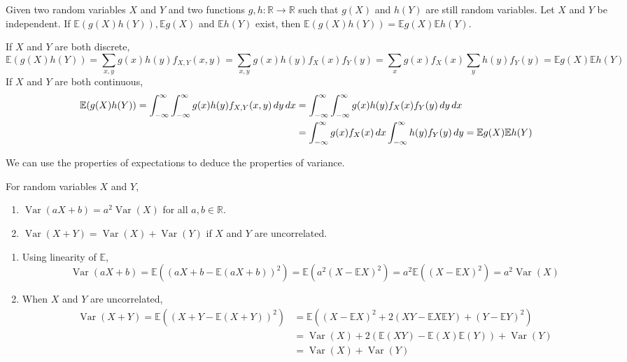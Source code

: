 \documentclass{huhtakm-template-book}
\newcommand{\expect}{\mathbb{E}}
\DeclareMathOperator{\Var}{Var}
\begin{document}
\begin{thm}
	Given two random variables $X$ and $Y$ and two functions $g,h:\mathbb{R}\to\mathbb{R}$ such that $g(X)$ and $h(Y)$ are still random variables. Let $X$ and $Y$ be independent. If $\expect(g(X)h(Y)),\expect{g(X)}$ and $\expect{h(Y)}$ exist, then $\expect(g(X)h(Y))=\expect g(X)\expect h(Y)$.
\end{thm}
\begin{proofing}
	If $X$ and $Y$ are both discrete,
	\begin{equation*}
		\expect(g(X)h(Y))=\sum_{x,y}g(x)h(y)f_{X,Y}(x,y)=\sum_{x,y}g(x)h(y)f_{X}(x)f_{Y}(y)=\sum_{x}g(x)f_{X}(x)\sum_{y}h(y)f_{Y}(y)=\expect g(X)\expect h(Y)
	\end{equation*}
	If $X$ and $Y$ are both continuous,
	\begin{align*}
		\expect(g(X)h(Y))=\intinfty\intinfty g(x)h(y)f_{X,Y}(x,y)\,dy\,dx&=\intinfty\intinfty g(x)h(y)f_{X}(x)f_{Y}(y)\,dy\,dx\\
		&=\intinfty g(x)f_{X}(x)\,dx\intinfty h(y)f_{Y}(y)\,dy=\expect{g(X)}\expect{h(Y)}
	\end{align*}
\end{proofing}
We can use the properties of expectations to deduce the properties of variance.
\begin{thm}
	For random variables $X$ and $Y$,
	\begin{enumerate}
		\item $\Var(aX+b)=a^{2}\Var(X)$ for all $a,b\in\mathbb{R}$.
		\item $\Var(X+Y)=\Var(X)+\Var(Y)$ if $X$ and $Y$ are uncorrelated.
	\end{enumerate}
\end{thm}
\begin{proofing}
	\begin{enumerate}
		\item Using linearity of $\expect$,
		\begin{equation*}
			\Var(aX+b)=\expect((aX+b-\expect(aX+b))^{2})=\expect(a^{2}(X-\expect X)^{2})=a^{2}\expect((X-\expect X)^{2})=a^{2}\Var(X)
		\end{equation*}
		\item When $X$ and $Y$ are uncorrelated,
		\begin{align*}
			\Var(X+Y)=\expect((X+Y-\expect(X+Y))^{2})&=\expect((X-\expect X)^{2}+2(XY-\expect X\expect Y)+(Y-\expect Y)^{2})\\
			&=\Var(X)+2(\expect(XY)-\expect(X)\expect(Y))+\Var(Y)\\
			&=\Var(X)+\Var(Y)
		\end{align*}
	\end{enumerate}
\end{proofing}
\end{document}
